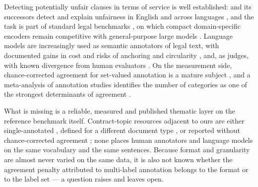 Detecting potentially unfair clauses in terms of service is well established: \corpus{} and its successors detect and explain unfairness in
English and across languages \cite{lippi2019claudette,lagioia2019deep,
ruggeri2022memory,drawzeski2021corpus,galassi2024multilingual,liepina2020claudettetool},
and the task is part of standard legal benchmarks \cite{chalkidis2022lexglue},
on which compact domain-specific encoders remain competitive with general-purpose
large models
\cite{chalkidis2020legalbert,dominguezolmedo2025lawma,panarelli2025worth,frasheri2024llm}.
Language models are increasingly used as semantic annotators of legal text, with
documented gains in cost and risks of anchoring and circularity
\cite{savelka2023unreasonable,gilardi2023chatgpt,schepers2025price,
li2023coannotating,choi2024llmeffect}, and, as judges, with known divergence from
human evaluators \cite{zheng2023judging,bavaresco2025judges,thalken2023legal}.
On the measurement side, chance-corrected agreement for set-valued annotation is
a mature subject \cite{krippendorff2018content,passonneau2006masi,
artstein2008intercoder,marchal2022multilabel,gwet2008ac1}, and a meta-analysis of
annotation studies identifies the number of categories as one of the strongest
determinants of agreement \cite{bayerl2011metaanalysis}.

What is missing is a reliable, measured and published thematic layer on the
reference benchmark itself. Contract-topic resources adjacent to ours are either
single-annotated \cite{braun2022topics}, defined for a different document type
\cite{tuggener2020ledgar,hendrycks2021cuad,wilson2016opp115}, or reported without
chance-corrected agreement \cite{loffler2025chilean,braun2024agbde}; none places
human annotators and language models on the same vocabulary and the same
sentences. Because format and granularity are almost never varied on the same
data, it is also not known whether the agreement penalty attributed to multi-label
annotation belongs to the format or to the label set --- a question
\cite{bayerl2011metaanalysis} raises and leaves open.
